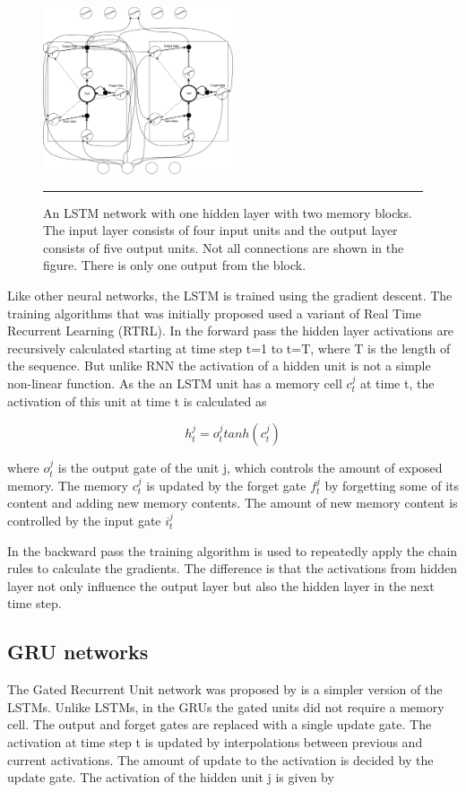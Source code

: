 \begin{figure}[htbp]
  \centering
    \includegraphics[width=0.5\textwidth,height=0.5\textheight,keepaspectratio]{Figures/lstm-network.pdf}
    \rule{35em}{0.5pt}
  \caption[An LSTM network]
{An LSTM network with one hidden layer with two memory blocks. The input layer consists of
four input units and the output layer consists of five output units. Not all connections are
shown in the figure. There is only one output from the block.}
  \label{fig:lstmNetwork}
\end{figure}

Like other neural networks, the LSTM is trained using the gradient descent. The training algorithms
that was initially proposed used a variant of Real Time Recurrent Learning (RTRL). In the forward pass
the hidden layer activations are recursively calculated starting at time step t=1 to t=T, where T
is the length of the sequence. But unlike RNN the activation of a hidden unit is not a simple non-linear
function. As the an LSTM unit has a memory cell $c^j_{t}$ at time t, the activation of this unit at
time t is calculated as

    \begin{equation}
        h^j_{t} = o^j_{t}tanh(c^j_{t})
    \end{equation}

where $o^j_{t}$ is the output gate of the unit j, which controls the amount of exposed memory.
The memory $c^j_{t}$ is updated by the forget gate $f^j_{t}$ by forgetting some of its content and
adding new memory contents. The amount of new memory content is controlled by the input gate
$i^j_{t}$

In the backward pass the training algorithm is used to repeatedly apply the chain rules to calculate
the gradients. The difference is that the activations from hidden layer not only influence the
output layer but also the hidden layer in the next time step.

\subsection{GRU networks}
The Gated Recurrent Unit network was proposed by \citet{cho2014properties} is a simpler version of
the LSTMs. Unlike LSTMs, in the GRUs the gated units did not require a memory cell. The output and
forget gates are replaced with a single update gate. The activation at time step t is updated by
interpolations between previous and current activations. The amount of update to the activation is
decided by the update gate. The activation of the hidden unit j is given by

